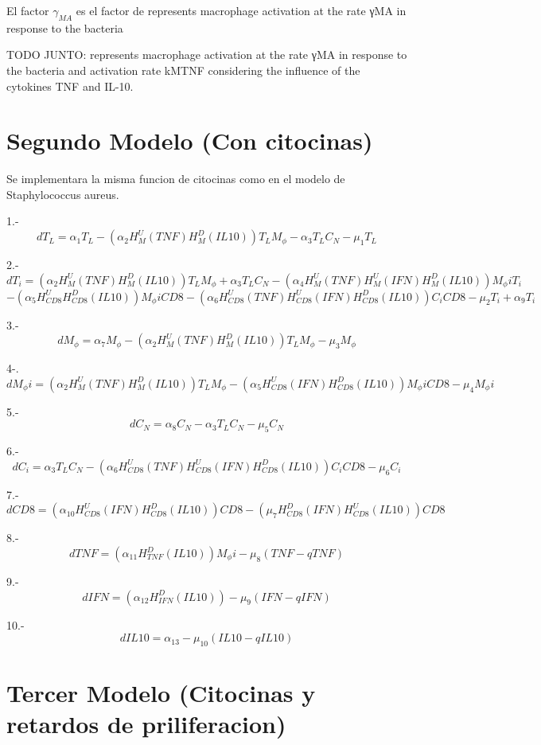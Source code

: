 \documentclass[
]{article}
\begin{document}
El factor \(\gamma _{MA}\) es el factor de represents macrophage
activation at the rate γMA in response to the bacteria

TODO JUNTO: represents macrophage activation at the rate γMA in response
to the bacteria and activation rate kMTNF considering the influence of
the cytokines TNF and IL-10.

\hypertarget{segundo-modelo-con-citocinas}{%
\section{Segundo Modelo (Con
citocinas)}\label{segundo-modelo-con-citocinas}}

Se implementara la misma funcion de citocinas como en el modelo de
Staphylococcus aureus.

1.-\[ d{T_{L}} = \alpha_{1} T_{L} - (\alpha_{2} H_{M}^U(TNF)H_{M}^D(IL10)) T_{L}M_{\phi} - \alpha_{3}T_{L}C_{N} - \mu_{1} T_{L} \]

2.-\[ dT_{i} = (\alpha_{2} H_{M}^{U}(TNF)H_{M}^{D}(IL10)) T_{L}M_{\phi} + \alpha_{3}T_{L}C_{N} - (\alpha_{4}H_{M}^{U}(TNF)H_{M}^{U}(IFN)H_{M}^{D}(IL10) )M_{\phi}iT_{i}\]
\[-(\alpha_{5}H_{CD8}^{U}H_{CD8}^{D}(IL10))M_{\phi}iCD8 - (\alpha_{6}H_{CD8}^{U}(TNF)H_{CD8}^{U}(IFN)H_{CD8}^{D}(IL10))C_{i}CD8 - \mu_{2} T_{i} + \alpha_{9}T_{i} \]

3.-\[ dM_{\phi} = \alpha_{7}M_{\phi} - (\alpha_{2}H_{M}^{U}(TNF)H_{M}^{D}(IL10) )T_{L}M_{\phi} - \mu_{3} M_{\phi} \]

4-.\[ dM_{\phi}i = (\alpha_{2}H_{M}^{U}(TNF)H_{M}^{D}(IL10))T_{L}M_{\phi} - (\alpha_{5} H_{CD8}^{U}(IFN)H_{CD8}^{D}(IL10))M_{\phi}iCD8 -\mu_{4} M_{\phi}i \]

5.-\[ dC_{N}= \alpha_{8}C_{N} - \alpha_{3}T_{L}C_{N} - \mu_{5} C_{N} \]

6.-\[ dC_{i} = \alpha_{3}T_{L}C_{N} - (\alpha_{6} H_{CD8}^{U}(TNF)H_{CD8}^{U}(IFN)H_{CD8}^{D}(IL10))C_{i}CD8 - \mu_{6} C_{i} \]

7.-
\[ dCD8 = (\alpha_{10}H_{CD8}^{U}(IFN)H_{CD8}^{D}(IL10)) CD8 - (\mu_{7}H_{CD8}^{D}(IFN)H_{CD8}^{U}(IL10) )CD8 \]

8.-
\[dTNF = (\alpha_{11}H_{TNF}^{D}(IL10))M_{\phi}i - \mu_{8}(TNF - qTNF)\]

9.- \[ dIFN = (\alpha_{12}H_{IFN}^{D}(IL10))- \mu_{9}(IFN-qIFN)  \]

10.- \[dIL10 = \alpha_{13} - \mu_{10}(IL10-qIL10)  \]

\hypertarget{tercer-modelo-citocinas-y-retardos-de-priliferacion}{%
\section{Tercer Modelo (Citocinas y retardos de
priliferacion)}\label{tercer-modelo-citocinas-y-retardos-de-priliferacion}}
\end{document}
